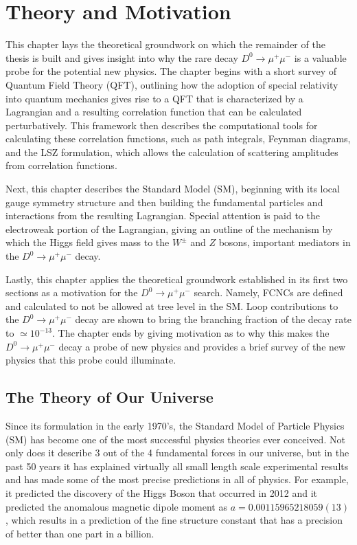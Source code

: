\chapter{Theory and Motivation}
\label{ch:2}

This chapter lays the theoretical groundwork on which the remainder of the thesis is built and gives insight into why the rare decay $D^0 \to \mu^+ \mu^-$ is a valuable probe for the potential new physics. The chapter begins with a short survey of Quantum Field Theory (QFT), outlining how the adoption of special relativity into quantum mechanics gives rise to a QFT that is characterized by a Lagrangian and a resulting correlation function that can be calculated perturbatively. This framework then describes the computational tools for calculating these correlation functions, such as path integrals, Feynman diagrams, and the LSZ formulation, which allows the calculation of scattering amplitudes from correlation functions. 

Next, this chapter describes the Standard Model (SM), beginning with its local gauge symmetry structure and then building the fundamental particles and interactions from the resulting Lagrangian. Special attention is paid to the electroweak portion of the Lagrangian, giving an outline of the mechanism by which the Higgs field gives mass to the $W^\pm$ and $Z$ bosons, important mediators in the $D^0 \to \mu^+ \mu^-$ decay. 

Lastly, this chapter applies the theoretical groundwork established in its first two sections as a motivation for the $D^0 \to \mu^+ \mu^-$ search. Namely, FCNCs are defined and calculated to not be allowed at tree level in the SM. Loop contributions to the $D^0 \to \mu^+ \mu^-$ decay are shown to bring the branching fraction of the decay rate to $\simeq 10^{-13}$. The chapter ends by giving motivation as to why this makes the $D^0 \to \mu^+ \mu^-$ decay a probe of new physics and provides a brief survey of the new physics that this probe could illuminate. 

\section{The Theory of Our Universe}

Since its formulation in the early 1970's, the Standard Model of Particle Physics (SM) has become one of the most successful physics theories ever conceived. Not only does it describe 3 out of the 4 fundamental forces in our universe, but in the past 50 years it has explained virtually all small length scale experimental results and has made some of the most precise predictions in all of physics. For example, it predicted the discovery of the Higgs Boson that occurred in 2012 \cite{ref:cms2012observation}\cite{ref:atlas2012observation} and it predicted the anomalous magnetic dipole moment as $a = 0.00115965218059(13)$ \cite{ref:fan_2023}, which results in a prediction of the fine structure constant that has a precision of better than one part in a billion.


